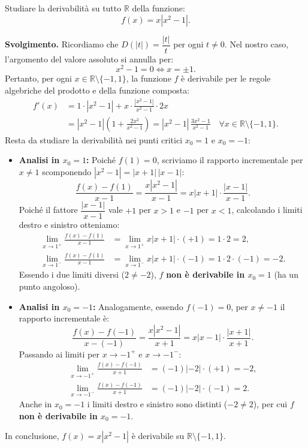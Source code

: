 \begin{esbox}[Esercizio svolto — Studio di derivabilità di $f(x) = x|x^2 - 1|$]
Studiare la derivabilità su tutto $\mathbb{R}$ della funzione:
\[
    f(x) = x|x^2 - 1|.
\]

\medskip
\noindent\textbf{Svolgimento.}
Ricordiamo che $D(|t|) = \dfrac{|t|}{t}$ per ogni $t \neq 0$. Nel nostro caso, l'argomento del valore assoluto si annulla per:
\[
    x^2 - 1 = 0 \iff x = \pm 1.
\]
Pertanto, per ogni $x \in \mathbb{R} \setminus \{-1, 1\}$, la funzione $f$ è derivabile per le regole algebriche del prodotto e della funzione composta:
\begin{align*}
    f'(x) &= 1 \cdot |x^2 - 1| + x \cdot \frac{|x^2 - 1|}{x^2 - 1} \cdot 2x \\
    &= |x^2 - 1|\left(1 + \frac{2x^2}{x^2 - 1}\right) = |x^2 - 1|\,\frac{3x^2 - 1}{x^2 - 1} \quad \forall x \in \mathbb{R} \setminus \{-1, 1\}.
\end{align*}
Resta da studiare la derivabilità nei punti critici $x_0 = 1$ e $x_0 = -1$:
\begin{itemize}
    \item \textbf{Analisi in $x_0 = 1$:} Poiché $f(1) = 0$, scriviamo il rapporto incrementale per $x \neq 1$ scomponendo $|x^2 - 1| = |x + 1|\,|x - 1|$:
    \[
        \frac{f(x) - f(1)}{x - 1} = \frac{x|x^2 - 1|}{x - 1} = x|x + 1| \cdot \frac{|x - 1|}{x - 1}.
    \]
    Poiché il fattore $\dfrac{|x - 1|}{x - 1}$ vale $+1$ per $x > 1$ e $-1$ per $x < 1$, calcolando i limiti destro e sinistro otteniamo:
    \begin{align*}
        \lim_{x \to 1^+} \frac{f(x) - f(1)}{x - 1} &= \lim_{x \to 1^+} x|x + 1| \cdot (+1) = 1 \cdot 2 = 2, \\
        \lim_{x \to 1^-} \frac{f(x) - f(1)}{x - 1} &= \lim_{x \to 1^-} x|x + 1| \cdot (-1) = 1 \cdot 2 \cdot (-1) = -2.
    \end{align*}
    Essendo i due limiti diversi ($2 \neq -2$), $f$ \textbf{non è derivabile in $x_0 = 1$} (ha un punto angoloso).

    \item \textbf{Analisi in $x_0 = -1$:} Analogamente, essendo $f(-1) = 0$, per $x \neq -1$ il rapporto incrementale è:
    \[
        \frac{f(x) - f(-1)}{x - (-1)} = \frac{x|x^2 - 1|}{x + 1} = x|x - 1| \cdot \frac{|x + 1|}{x + 1}.
    \]
    Passando ai limiti per $x \to -1^+$ e $x \to -1^-$:
    \begin{align*}
        \lim_{x \to -1^+} \frac{f(x) - f(-1)}{x + 1} &= (-1)|-2| \cdot (+1) = -2, \\
        \lim_{x \to -1^-} \frac{f(x) - f(-1)}{x + 1} &= (-1)|-2| \cdot (-1) = 2.
    \end{align*}
    Anche in $x_0 = -1$ i limiti destro e sinistro sono distinti ($-2 \neq 2$), per cui $f$ \textbf{non è derivabile in $x_0 = -1$}.
\end{itemize}
In conclusione, $f(x) = x|x^2 - 1|$ è derivabile su $\mathbb{R} \setminus \{-1, 1\}$.
\end{esbox}

